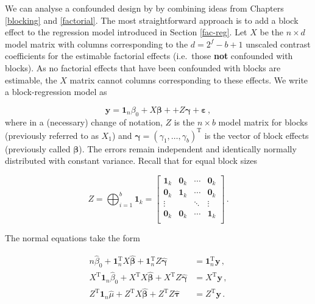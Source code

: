 \documentclass[
]{book}
\theoremstyle{definition}
\theoremstyle{definition}
\theoremstyle{definition}
\theoremstyle{definition}
\theoremstyle{remark}
\begin{document}
We can analyse a confounded design by by combining ideas from Chapters \ref{blocking} and \ref{factorial}. The most straightforward approach is to add a block effect to the regression model introduced in Section \ref{fac-reg}. Let \(X\) be the \(n\times d\) model matrix with columns corresponding to the \(d = 2^f - b +1\) unscaled contrast coefficients for the estimable factorial effects (i.e.~those \textbf{not} confounded with blocks). As no factorial effects that have been confounded with blocks are estimable, the \(X\) matrix cannot columns corresponding to these effects. We write a block-regression model as

\[
\boldsymbol{y}= \boldsymbol{1}_n\beta_0 + X\boldsymbol{\beta} + + Z\boldsymbol{\gamma} + \boldsymbol{\varepsilon}\,,
\]
where in a (necessary) change of notation, \(Z\) is the \(n \times b\) model matrix for blocks (previously referred to as \(X_1\)) and \(\boldsymbol{\gamma} = (\gamma_1,\ldots, \gamma_b)^{\mathrm{T}}\) is the vector of block effects (previously called \(\boldsymbol{\beta}\)). The errors remain independent and identically normally distributed with constant variance. Recall that for equal block sizes

\[
Z = \bigoplus_{i = 1}^b \boldsymbol{1}_{k} = \begin{bmatrix}
\boldsymbol{1}_{k} & \boldsymbol{0}_{k} & \cdots &  \boldsymbol{0}_{k} \\
\boldsymbol{0}_{k} & \boldsymbol{1}_{k} & \cdots &  \boldsymbol{0}_{k} \\
\vdots & & \ddots & \vdots \\
\boldsymbol{0}_{k} & \boldsymbol{0}_{k} & \cdots &  \boldsymbol{1}_{k} \\
\end{bmatrix}\,.
\]

The normal equations take the form

\begin{align}
n\hat{\beta}_0 + \boldsymbol{1}_n^{\mathrm{T}}X\hat{\boldsymbol{\beta}} + \boldsymbol{1}_n^{\mathrm{T}}Z\hat{\boldsymbol{\gamma}} & = \boldsymbol{1}_n^{\mathrm{T}}\boldsymbol{y}\,, \label{eq:fact-blocks-normal-1}\\
X^{\mathrm{T}}\boldsymbol{1}_n\hat{\beta}_0 + X^{\mathrm{T}}X\hat{\boldsymbol{\beta}} + X^{\mathrm{T}}Z\hat{\boldsymbol{\gamma}} & = X^{\mathrm{T}}\boldsymbol{y}\,, \label{eq:fact-blocks-normal-2}\\
Z^{\mathrm{T}}\boldsymbol{1}_n\hat{\mu} + Z^{\mathrm{T}}X\hat{\boldsymbol{\beta}} + Z^{\mathrm{T}}Z\hat{\boldsymbol{\tau}} & = Z^{\mathrm{T}}\boldsymbol{y}\,. \label{eq:fact-blocks-normal-3}\\
\end{align}
\end{document}
